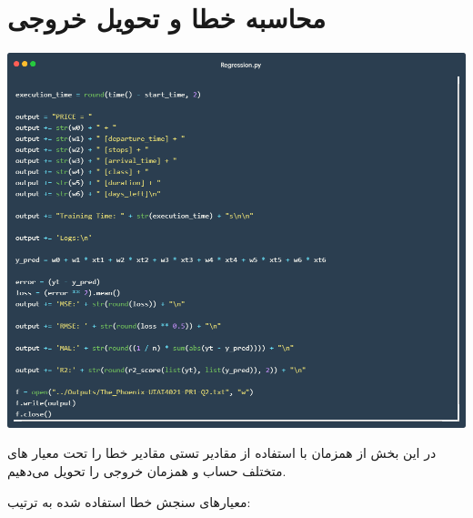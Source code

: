 \documentclass[12pt, dvipsnames, svgnames, x11names,]{article}
\begin{document}
		
	
	
	\section{محاسبه خطا و تحویل خروجی}
	
	\includegraphics[width=14cm]{images/code08} \par
	{\normalsize 
		در این بخش از همزمان با استفاده از مقادیر تستی مقادیر خطا را تحت معیار های متختلف حساب و همزمان خروجی را تحویل می‌دهیم.
		
		معیارهای سنجش خطا استفاده شده به ترتیب:
	}
\end{document}
